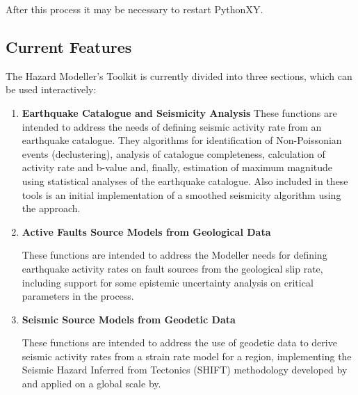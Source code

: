 After this process it may be necessary to restart PythonXY.




\subsection{Current Features}

The Hazard Modeller's Toolkit is currently divided into three sections, which can be used interactively: 

\begin{enumerate}
\item \textbf{Earthquake Catalogue and Seismicity Analysis}
    These functions are intended to address the needs of defining seismic activity rate from an earthquake catalogue. They algorithms for identification of Non-Poissonian events (declustering), analysis of catalogue completeness, calculation of activity rate and b-value and, finally, estimation of maximum magnitude using statistical analyses of the earthquake catalogue. Also included in these tools is an initial implementation of a smoothed seismicity algorithm using the \cite{frankel1995} approach.
     
\item \textbf{Active Faults Source Models from Geological Data}

    These functions are intended to address the Modeller needs for defining earthquake activity rates on fault sources from the geological slip rate, including support for some epistemic uncertainty analysis on critical parameters in the process.

\item \textbf{Seismic Source Models from Geodetic Data}

    These functions are intended to address the use of geodetic data to derive seismic activity rates from a strain rate model for a region, implementing the Seismic Hazard Inferred from Tectonics (SHIFT) methodology developed by \cite{BirdLiu2007} and applied on a global scale by\cite{Bird_etal2010}.
\end{enumerate}

